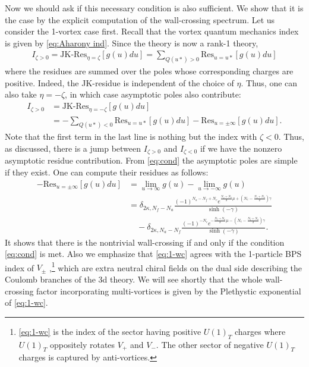 \documentclass[a4paper,11pt]{article}
\begin{document}
Now we should ask if this necessary condition is also sufficient. We show that it is the case by the explicit computation of the wall-crossing spectrum. Let us consider the 1-vortex case first. Recall that the vortex quantum mechanics index is given by \eqref{eq:Aharony ind}. Since the theory is now a rank-1 theory,
\begin{align}
I_{\zeta > 0} = \text{JK-Res}_{\eta = \zeta} \left[g(u) du\right] = \sum_{Q(u*) > 0} \mathrm{Res}_{u = u*} \left[g(u) du\right]
\end{align}
where the residues are summed over the poles whose corresponding charges are positive. Indeed, the JK-residue is independent of the choice of $\eta$. Thus, one can also take $\eta = -\zeta$, in which case asymptotic poles also contribute:
\begin{align}
I_{\zeta > 0} &= \text{JK-Res}_{\eta = -\zeta} \left[g(u) du\right] \nonumber \\
&= -\sum_{Q(u*) < 0} \mathrm{Res}_{u = u*} \left[g(u) du\right]-\mathrm{Res}_{u = \pm \infty} \left[g(u) du\right].
\end{align}
Note that the first term in the last line is nothing but the index with $\zeta < 0$. Thus, as discussed, there is a jump between $I_{\zeta > 0}$ and $I_{\zeta < 0}$ if we have the nonzero asymptotic residue contribution. From \eqref{eq:cond} the asymptotic poles are simple if they exist. One can compute their residues as follows:
\begin{align}
%
-\mathrm{Res}_{u = \pm \infty} \left[g(u) du\right] &= \lim_{u \rightarrow \infty} g(u)-\lim_{u \rightarrow -\infty} g(u) \\
%
&= \delta_{2 \kappa,N_f-N_a} \frac{(-1)^{N_a-N_f+N_c} e^{\frac{N_f+N_a}{2} \mu+(N_c-\frac{N_f+N_a}{2}) \gamma}}{\sinh(-\gamma)} \nonumber \\
&\quad -\delta_{2 \kappa,N_a-N_f} \frac{(-1)^{-N_c} e^{-\frac{N_f+N_a}{2} \mu-(N_c-\frac{N_f+N_a}{2}) \gamma}}{\sinh(-\gamma)}. \label{eq:1-wc}
%
\end{align}
It shows that there is the nontrivial wall-crossing if and only if the condition \eqref{eq:cond} is met. Also we emphasize that \eqref{eq:1-wc} agrees with the 1-particle BPS index of $V_\pm$ \cite{Hwang:2012jh,Hwang:2015wna},\footnote{\eqref{eq:1-wc} is the index of the sector having positive $U(1)_T$ charges where $U(1)_T$ oppositely rotates $V_+$ and $V_-$. The other sector of negative $U(1)_T$ charges is captured by anti-vortices.} which are extra neutral chiral fields on the dual side describing the Coulomb branches of the 3d theory. We will see shortly that the whole wall-crossing factor incorporating multi-vortices is given by the Plethystic exponential of \eqref{eq:1-wc}.
\end{document}
